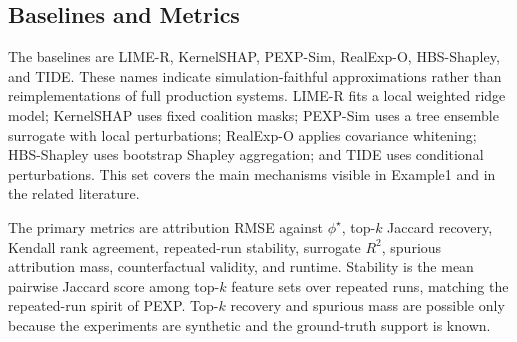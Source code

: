 \documentclass[10pt,conference,letterpaper]{IEEEtran}
\begin{document}
\begin{table}[t]
\centering
\caption{Simulation tasks.  The true contribution vector is analytically available for every target instance.}
\label{tab:datasets}
\end{table}

\subsection{Baselines and Metrics}
The baselines are LIME-R, KernelSHAP, PEXP-Sim, RealExp-O, HBS-Shapley, and TIDE.  These names indicate simulation-faithful approximations rather than reimplementations of full production systems.  LIME-R fits a local weighted ridge model; KernelSHAP uses fixed coalition masks; PEXP-Sim uses a tree ensemble surrogate with local perturbations; RealExp-O applies covariance whitening; HBS-Shapley uses bootstrap Shapley aggregation; and TIDE uses conditional perturbations.  This set covers the main mechanisms visible in Example1 and in the related literature.

The primary metrics are attribution RMSE against $\phi^\star$, top-$k$ Jaccard recovery, Kendall rank agreement, repeated-run stability, surrogate $R^2$, spurious attribution mass, counterfactual validity, and runtime.  Stability is the mean pairwise Jaccard score among top-$k$ feature sets over repeated runs, matching the repeated-run spirit of PEXP.  Top-$k$ recovery and spurious mass are possible only because the experiments are synthetic and the ground-truth support is known.
\end{document}

